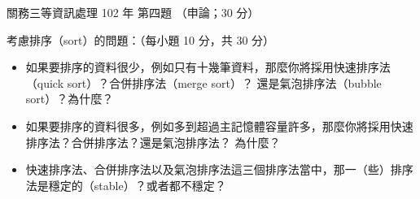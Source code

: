 \begin{pastexam}[label={px:gw3-102-ds-04}]{關務三等資訊處理 102 年 第四題}
（申論；30 分）

考慮排序（sort）的問題：（每小題 10 分，共 30 分）
\begin{itemize}[leftmargin=2.2em]
\item[㈠] 如果要排序的資料很少，例如只有十幾筆資料，那麼你將採用快速排序法（quick sort）？合併排序法（merge sort）？
還是氣泡排序法（bubble sort）？為什麼？
\item[㈡] 如果要排序的資料很多，例如多到超過主記憶體容量許多，那麼你將採用快速排序法？合併排序法？還是氣泡排序法？
為什麼？
\item[㈢] 快速排序法、合併排序法以及氣泡排序法這三個排序法當中，那一（些）排序法是穩定的（stable）？或者都不穩定？
\end{itemize}
\end{pastexam}


